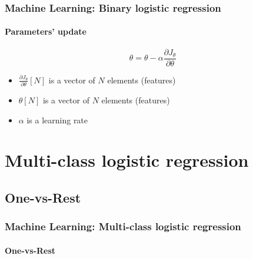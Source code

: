 \documentclass[xcolor=table]{beamer}
\begin{document}
\begin{frame}
	\frametitle{Machine Learning: Binary logistic regression}
	\framesubtitle{Parameters' update}

	\[\theta = \theta - \alpha \frac{\partial J_\theta}{\partial \theta}\]
	
	\begin{itemize}
		\item $\frac{\partial J_\theta}{\partial \theta}[N]$ is a vector of $N$ elements (features)
		\item $\theta[N]$ is a vector of $N$ elements (features)
		\item $\alpha $ is a learning rate
	\end{itemize}
	
\end{frame}

\section{Multi-class logistic regression}

%	
%	

\subsection{One-vs-Rest}

\begin{frame}
	\frametitle{Machine Learning: Multi-class logistic regression}
	\framesubtitle{One-vs-Rest}
	
	\begin{center}
	\end{center}
	
\end{frame}
\end{document}
